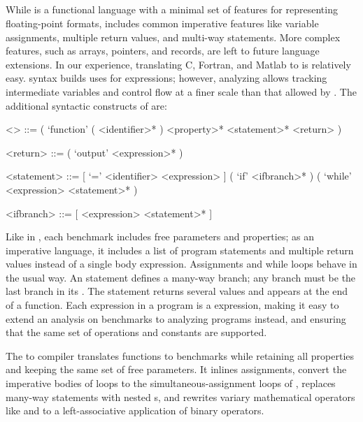 \documentclass[main.tex]{subfiles}
\begin{document}
\subsection{\surface}

While \core is a functional language
  with a minimal set of features
  for representing floating-point formats,
  \surface includes common imperative features
  like variable assignments,
  multiple return values,
  and multi-way  statements.
More complex features,
  such as arrays, pointers, and records,
  are left to future language extensions.
In our experience,
  translating C, Fortran, and Matlab to \surface is relatively easy.
\surface syntax builds uses \core for expressions;
  however, analyzing \surface allows tracking intermediate variables
  and control flow at a finer scale than that allowed by \core.
The additional syntactic constructs of \surface are:

\begin{grammar}
<\surface> ::= ( `function' ( <identifier>* ) <property>* <statement>* <return> )

<return> ::= ( `output' <expression>* )

<statement> ::= [ `=' <identifier> <expression> ]
\alt ( `if' <ifbranch>* )
\alt ( `while' <expression> <statement>* )

<ifbranch> ::= [ <expression> <statement>* ]
\end{grammar}

Like in \core, each \surface benchmark
  includes free parameters and properties;
  as an imperative language,
  it includes a list of program statements
  and multiple return values
  instead of a single body expression.
Assignments and while loops behave in the usual way.
An  statement defines a many-way branch;
  any  branch must be the last branch in its .
The  statement returns several values and appears
  at the end of a function.
Each expression in a \surface program is a \core expression,
  making it easy to extend an analysis on \core benchmarks
  to analyzing \surface programs instead,
  and ensuring that the same set of operations and constants
  are supported.

The \surface to \core compiler
  translates \surface functions to \core benchmarks
  while retaining all properties and keeping the same set of free parameters.
It inlines assignments, convert the imperative bodies of \surface loops
  to the simultaneous-assignment loops of \core,
  replaces many-way  statements with nested s,
  and rewrites variary mathematical operators like \C{+} and \C{*}
  to a left-associative application of binary operators.
\end{document}
